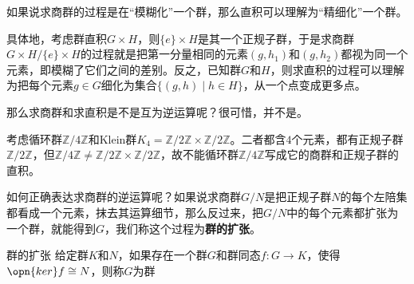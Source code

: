 


如果说求商群的过程是在“模糊化”一个群，那么直积可以理解为“精细化”一个群。

具体地，考虑群直积$G\times H$，则$\{e\}\times H$是其一个正规子群，于是求商群$G\times H/\{e\}\times H$的过程就是把第一分量相同的元素$(g, h_1)$和$(g, h_2)$都视为同一个元素，即模糊了它们之间的差别。反之，已知群$G$和$H$，则求直积的过程可以理解为把每个元素$g\in G$细化为集合$\{(g, h)\mid h\in H\}$，从一个点变成更多点。


那么求商群和求直积是不是互为逆运算呢？很可惜，并不是。



\begin{example}{}
考虑循环群$\mathbb{Z}/4\mathbb{Z}$和Klein群$K_4=\mathbb{Z}/2\mathbb{Z}\times \mathbb{Z}/2\mathbb{Z}$。二者都含$4$个元素，都有正规子群$\mathbb{Z}/2\mathbb{Z}$，但$\mathbb{Z}/4\mathbb{Z}\neq \mathbb{Z}/2\mathbb{Z}\times \mathbb{Z}/2\mathbb{Z}$，故不能循环群$\mathbb{Z}/4\mathbb{Z}$写成它的商群和正规子群的直积。
\end{example}




如何正确表达求商群的逆运算呢？如果说求商群$G/N$是把正规子群$N$的每个左陪集都看成一个元素，抹去其运算细节，那么反过来，把$G/N$中的每个元素都扩张为一个群，就能得到$G$，我们称这个过程为\textbf{群的扩张}。



\begin{definition}{群的扩张}
给定群$K$和$N$，如果存在一个群$G$和群同态$f:G\to K$，使得$\opn{ker}f\cong N$，则称$G$为群$$
\end{definition}




































